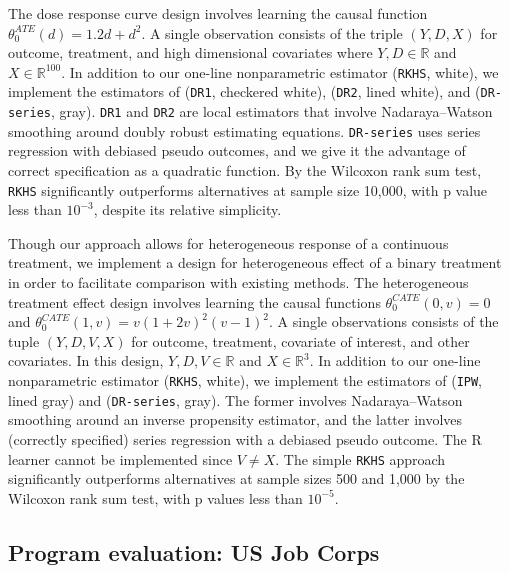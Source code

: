 The dose response curve design \cite{colangelo2020double} involves learning the causal function $\theta_0^{ATE}(d)=1.2d+d^2$. A single observation consists of the triple $(Y,D,X)$ for outcome, treatment, and high dimensional covariates where $Y,D\in\mathbb{R}$ and $X\in\mathbb{R}^{100}$. In addition to our one-line nonparametric estimator (\texttt{RKHS}, white), we implement the estimators of \cite{kennedy2017nonparametric} (\texttt{DR1}, checkered white), \cite{colangelo2020double} (\texttt{DR2}, lined white), and \cite{semenova2021debiased} (\texttt{DR-series}, gray). \texttt{DR1} and \texttt{DR2} are local estimators that involve Nadaraya--Watson smoothing around doubly robust estimating equations. \texttt{DR-series} uses series regression with debiased pseudo outcomes, and we give it the advantage of correct specification as a quadratic function. By the Wilcoxon rank sum test, \texttt{RKHS} significantly outperforms alternatives at sample size 10,000, with p value less than $10^{-3}$, despite its relative simplicity.

Though our approach allows for heterogeneous response of a continuous treatment, we implement a design for heterogeneous effect of a binary treatment in order to facilitate comparison with existing methods. The heterogeneous treatment effect design \cite{abrevaya2015estimating} involves learning the causal functions $\theta_0^{CATE}(0,v)=0$ and $\theta_0^{CATE}(1,v)=v(1+2v)^2(v-1)^2$. A single observations consists of the tuple $(Y,D,V,X)$ for outcome, treatment, covariate of interest, and other covariates. In this design, $Y,D,V\in\mathbb{R}$ and  $X\in\mathbb{R}^3$. In addition to our one-line nonparametric estimator (\texttt{RKHS}, white), we implement the estimators of \cite{abrevaya2015estimating} (\texttt{IPW}, lined gray) and \cite{semenova2021debiased} (\texttt{DR-series}, gray). The former involves Nadaraya--Watson smoothing around an inverse propensity estimator, and the latter involves (correctly specified) series regression with a debiased pseudo outcome. The R learner \cite{nie2021quasi} cannot be implemented since $V\neq X$. The simple \texttt{RKHS} approach significantly outperforms alternatives at sample sizes 500 and 1,000 by the Wilcoxon rank sum test, with p values less than $10^{-5}$. 
\subsection{Program evaluation: US Job Corps}


